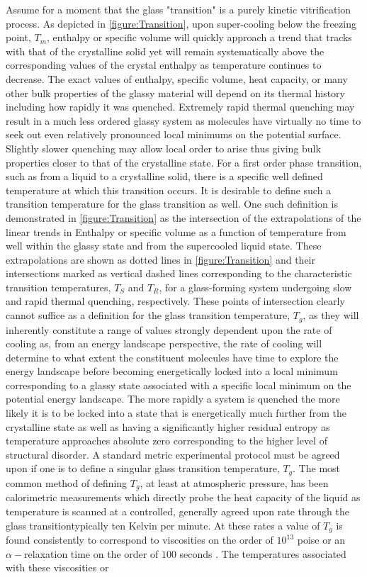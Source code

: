 Assume for a moment that the glass "transition" is a purely kinetic vitrification process.  As depicted in \fig \nolinebreak \ref{figure:Transition}, upon super-cooling below the freezing point, $T_m$, enthalpy or specific volume will quickly approach a trend that tracks with that of the crystalline solid yet will remain systematically above the corresponding values of the crystal enthalpy as temperature continues to decrease. The exact values of enthalpy, specific volume, heat capacity, or many other bulk properties of the glassy material will depend on its thermal history including how rapidly it was quenched.  Extremely rapid thermal quenching may result in a much less ordered glassy system as molecules have virtually no time to seek out even relatively pronounced local minimums on the potential surface.  Slightly slower quenching may allow local order to arise thus giving bulk properties closer to that of the crystalline state.  For a first order phase transition, such as from a liquid to a crystalline solid, there is a specific well defined temperature at which this transition occurs.  It is desirable to define such a transition temperature for the glass transition as well.  One such definition is demonstrated in \fig \nolinebreak \ref{figure:Transition} as the intersection of the extrapolations of the linear trends in Enthalpy or specific volume as a function of temperature from well within the glassy state and from the supercooled liquid state.  These extrapolations are shown as dotted lines in \fig \nolinebreak \ref{figure:Transition} and their intersections marked as vertical dashed lines corresponding to the characteristic transition temperatures, $T_S$ and $T_R$, for a glass-forming system undergoing slow and rapid thermal quenching, respectively.  These points of intersection clearly cannot suffice as a definition for the glass transition temperature, $T_g$,  as they will inherently constitute a range of values strongly dependent upon the rate of cooling as, from an energy landscape perspective, the rate of cooling will determine to what extent the constituent molecules have time to explore the energy landscape before becoming energetically locked into a local minimum corresponding to a glassy state associated with a specific local minimum on the potential energy landscape. The more rapidly a system is quenched the more likely it is to be locked into a state that is energetically much further from the crystalline state as well as having a significantly higher residual entropy as temperature approaches absolute zero corresponding to the higher level of structural disorder.  A standard metric experimental protocol must be agreed upon if one is to define a singular glass transition temperature, $T_g$.  The most common method of defining $T_g$, at least at atmospheric pressure, has been \via calorimetric measurements which directly probe the heat capacity of the liquid as temperature is scanned at a controlled, generally agreed upon rate through the glass transition\textemdash typically ten Kelvin per minute.  At these rates a value of $T_g$ is found consistently to correspond to viscosities on the order of $10^{13}$ poise or an $\alpha-$relaxation time on the order of $100$ seconds \nolinebreak \cite{Stebbins}.  The temperatures associated with these viscosities or 